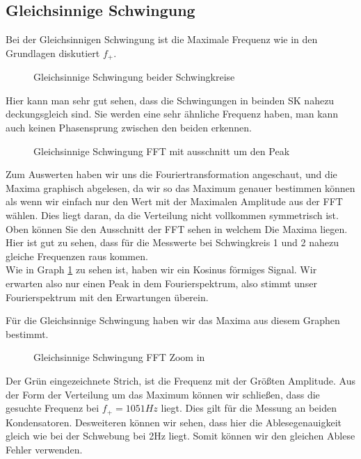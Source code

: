 \documentclass[twoside]{protokoll}
\begin{document}
\subsection{Gleichsinnige Schwingung}
Bei der Gleichsinnigen Schwingung ist die Maximale Frequenz wie in den Grundlagen diskutiert $f_+$.
\begin{figure}[H]
    \centering
    \caption{Gleichsinnige Schwingung beider Schwingkreise}
    \label{gleichsinnige Schwingung}
\end{figure}
Hier kann man sehr gut sehen, dass die Schwingungen in beinden SK nahezu deckungsgleich sind. Sie werden eine sehr ähnliche Frequenz haben, man kann auch keinen Phasensprung zwischen den beiden erkennen.
\begin{figure}[H]
    \centering
    \caption{Gleichsinnige Schwingung FFT mit ausschnitt um den Peak}
\end{figure}
Zum Auswerten haben wir uns die Fouriertransformation angeschaut, und die Maxima graphisch abgelesen, da wir so das Maximum genauer bestimmen können als wenn wir einfach nur den Wert mit der Maximalen Amplitude aus der FFT wählen.
Dies liegt daran, da die Verteilung nicht vollkommen symmetrisch ist.
Oben können Sie den Ausschnitt der FFT sehen in welchem Die Maxima liegen. 
Hier ist gut zu sehen, dass für die Messwerte bei Schwingkreis 1 und 2 nahezu gleiche Frequenzen raus kommen.\\
Wie in Graph \ref{gleichsinnige Schwingung} zu sehen ist, haben wir ein Kosinus förmiges Signal. Wir erwarten also nur einen Peak in dem Fourierspektrum, also stimmt unser Fourierspektrum mit den Erwartungen überein. 


Für die Gleichsinnige Schwingung haben wir das Maxima aus diesem Graphen bestimmt. 
\begin{figure}[H]
    \centering
    \caption{Gleichsinnige Schwingung FFT Zoom in}
\end{figure}
Der Grün eingezeichnete Strich, ist die Frequenz mit der Größten Amplitude.
Aus der Form der Verteilung um das Maximum können wir schließen, dass die gesuchte Frequenz bei $f_+=1051Hz$ liegt. Dies gilt für die Messung an beiden Kondensatoren.
Desweiteren können wir sehen, dass hier die Ablesegenauigkeit gleich wie bei der Schwebung bei 2Hz liegt. Somit können wir den gleichen Ablese Fehler verwenden.
\end{document}
